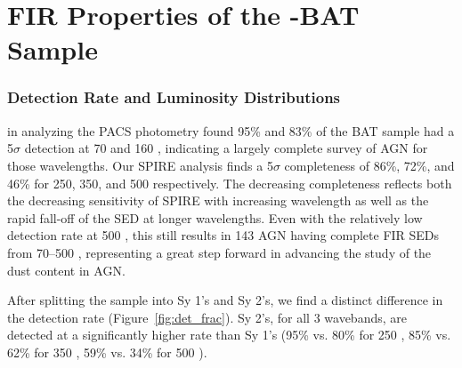 \section{FIR Properties of the \herschel-BAT Sample }
\subsubsection{Detection Rate and Luminosity Distributions}\label{sec:det_rate_lum_dist}
\citet{Melendez:2014yu} in analyzing the PACS photometry found 95\% and 83\% of the BAT sample had a 5$\sigma$ detection at 70 and 160 \um, indicating a largely complete survey of AGN for those wavelengths. Our SPIRE analysis finds a 5$\sigma$ completeness of 86\%, 72\%, and 46\% for 250, 350, and 500 \um{} respectively. The decreasing completeness reflects both the decreasing sensitivity of SPIRE with increasing wavelength as well as the rapid fall-off of the SED at longer wavelengths. Even with the relatively low detection rate at 500 \um, this still results in 143 AGN having complete FIR SEDs from 70--500 \um, representing a great step forward in advancing the study of the dust content in AGN. 

After splitting the sample into Sy 1's and Sy 2's, we find a distinct difference in the detection rate (Figure~\ref{fig:det_frac}). Sy 2's, for all 3 wavebands, are detected at a significantly higher rate than Sy 1's (95\% vs. 80\% for 250 \um, 85\% vs. 62\% for 350 \um, 59\% vs. 34\% for 500 \um).
  